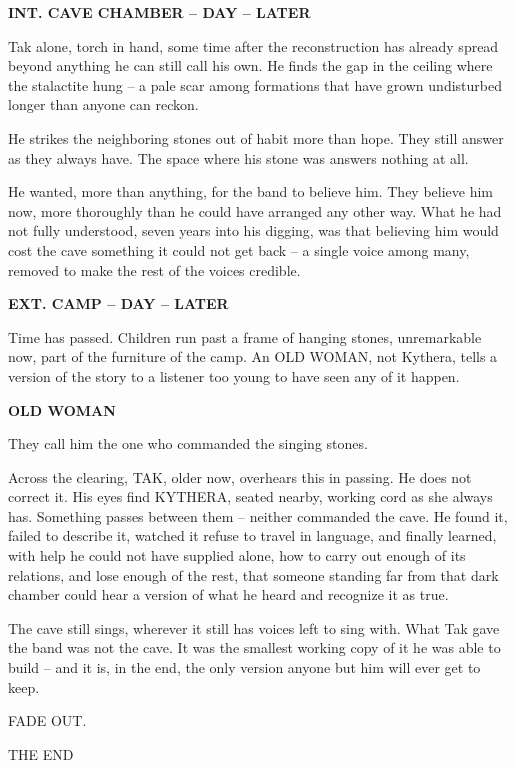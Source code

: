 \documentclass[12pt]{article}
\newcommand{\sceneheading}[1]{%
  \bigskip\noindent\textbf{#1}\par\smallskip
}
\newcommand{\action}[1]{%
  \noindent #1\par\medskip
}
\newcommand{\charcue}[1]{%
  \par\hspace*{2.2in}\textbf{#1}\par
}
\newenvironment{dialogue}{%
  \begin{list}{}{\leftmargin=1.5in\rightmargin=2in\itemsep=0pt\parsep=0pt\topsep=0pt}
  \item[]
}{%
  \end{list}\medskip
}
\begin{document}
\sceneheading{INT. CAVE CHAMBER -- DAY -- LATER}

\action{Tak alone, torch in hand, some time after the reconstruction has already spread beyond anything he can still call his own. He finds the gap in the ceiling where the stalactite hung -- a pale scar among formations that have grown undisturbed longer than anyone can reckon.}

\action{He strikes the neighboring stones out of habit more than hope. They still answer as they always have. The space where his stone was answers nothing at all.}

\action{He wanted, more than anything, for the band to believe him. They believe him now, more thoroughly than he could have arranged any other way. What he had not fully understood, seven years into his digging, was that believing him would cost the cave something it could not get back -- a single voice among many, removed to make the rest of the voices credible.}

\sceneheading{EXT. CAMP -- DAY -- LATER}

\action{Time has passed. Children run past a frame of hanging stones, unremarkable now, part of the furniture of the camp. An OLD WOMAN, not Kythera, tells a version of the story to a listener too young to have seen any of it happen.}

\charcue{OLD WOMAN}
\begin{dialogue}
They call him the one who commanded the singing stones.
\end{dialogue}

\action{Across the clearing, TAK, older now, overhears this in passing. He does not correct it. His eyes find KYTHERA, seated nearby, working cord as she always has. Something passes between them -- neither commanded the cave. He found it, failed to describe it, watched it refuse to travel in language, and finally learned, with help he could not have supplied alone, how to carry out enough of its relations, and lose enough of the rest, that someone standing far from that dark chamber could hear a version of what he heard and recognize it as true.}

\action{The cave still sings, wherever it still has voices left to sing with. What Tak gave the band was not the cave. It was the smallest working copy of it he was able to build -- and it is, in the end, the only version anyone but him will ever get to keep.}

FADE OUT.

\bigskip
\centerline{THE END}
\end{document}
